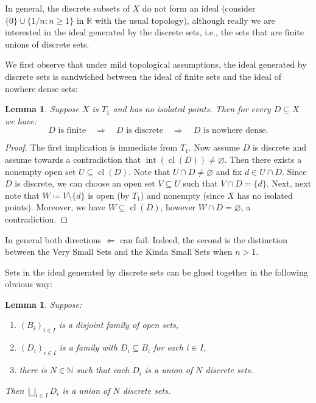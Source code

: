 \documentclass[11pt]{amsart}
\theoremstyle{plain}
\newtheorem{lemma}[thm]{Lemma}
\theoremstyle{definition}
\numberwithin{equation}{section}
\newcommand\N{\mathbb{N}}
\newcommand\R{\mathbb{R}}
\newcommand\0{\varnothing}
\DeclareMathOperator\cl{cl}
\begin{document}
\medskip\noindent
In general, the discrete subsets of $X$ do not form an ideal (consider $\{0\}\cup\{1/n:n\geq 1\}$ in $\R$ with the usual topology), although really we are interested in the ideal generated by the discrete sets, i.e., the sets that are finite unions of discrete sets.


\medskip\noindent
We first observe that under mild topological assumptions, the ideal generated by discrete sets is sandwiched between the ideal of finite sets and the ideal of nowhere dense sets:

\begin{lemma}\label{discrete_implies_nowhere_dense_under_mild_assumptions}
Suppose $X$ is $T_1$ and has no isolated points. Then for every $D\subseteq X$ we have:
\[
\text{$D$ is finite} \quad \Rightarrow \quad \text{$D$ is discrete} \quad \Rightarrow \quad \text{$D$ is nowhere dense}.
\]
\end{lemma}
\begin{proof}
The first implication is immediate from $T_1$. Now assume $D$ is discrete and assume towards a contradiction that $\operatorname{int}(\operatorname{cl}(D))\neq\varnothing$. Then there exists a nonempty open set $U\subseteq \cl(D)$. Note that $U\cap D\neq\varnothing$ and fix $d\in U\cap D$. Since $D$ is discrete, we can choose an open set $V\subseteq U$ such that $V\cap D=\{d\}$.
Next, next note that $W\coloneqq V\setminus\{d\}$ is open (by $T_1$) and nonempty (since $X$ has no isolated points). Moreover, we have $W\subseteq \operatorname{cl}(D)$, however $W\cap D=\varnothing$, a contradiction.
\end{proof}



\noindent
In general both directions $\Leftarrow$ can fail. Indeed, the second is the distinction between the Very Small Sets and the Kinda Small Sets when $n>1$.



\medskip\noindent
Sets in the ideal generated by discrete sets can be glued together in the following obvious way:

\begin{lemma}\label{discrete_gluing_lemma}
Suppose:
\begin{enumerate}
\item $(B_i)_{i\in I}$ is a disjoint family of open sets,
\item $(D_i)_{i\in I}$ is a family with $D_i \subseteq B_i$ for each $i \in I$,
\item there is $N \in \N$ such that each $D_i$ is a union of $N$ discrete sets.
\end{enumerate}
Then $\bigsqcup_{i\in I}D_i$ is a union of $N$ discrete sets. 
\end{lemma}
\end{document}
